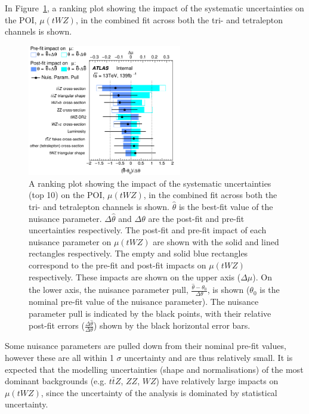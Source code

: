 In Figure~\ref{fig:4lep-combined-nuisance-ranking}, a ranking plot showing the impact of the systematic uncertainties on the POI, $\mu (tWZ)$, in the combined fit across both the tri- and tetralepton channels is shown.
\begin{figure}
    \centering
    \includegraphics[width=0.6\textwidth]{figures/combined/RankingSysts_SigXsecOverSM_systs.png}
    \caption{A ranking plot showing the impact of the systematic uncertainties (top 10) on the POI, $\mu (tWZ)$, in the combined fit across both the tri- and tetralepton channels is shown. $\hat{\theta}$ is the best-fit value of the nuisance parameter. $\Delta \hat{\theta}$ and $\Delta\theta$ are the post-fit and pre-fit uncertainties respectively. The post-fit and pre-fit impact of each nuisance parameter on $\mu (tWZ)$ are shown with the solid and lined rectangles respectively. The empty and solid blue rectangles correspond to the pre-fit and post-fit impacts on $\mu (tWZ)$ respectively. These impacts are shown on the upper axis ($\Delta \mu$). On the lower axis, the nuisance parameter pull, $\frac{\hat{\theta} - \theta_{0}}{\Delta{\theta}}$, is shown ($\theta_{0}$ is the nominal pre-fit value of the nuisance parameter). The nuisance parameter pull is indicated by the black points, with their relative post-fit errors ($\frac{\Delta \hat{\theta}}{\Delta \theta}$) shown by the black horizontal error bars.}
    \label{fig:4lep-combined-nuisance-ranking}
\end{figure}

Some nuisance parameters are pulled down from their nominal pre-fit values, however these are all within 1 $\sigma$ uncertainty and are thus relatively small. It is expected that the modelling uncertainties (shape and normalisations) of the most dominant backgrounds (e.g. $t\bar{t}Z$, $ZZ$, $WZ$) have relatively large impacts on $\mu(tWZ)$, since the uncertainty of the analysis is dominated by statistical uncertainty.\\\\

